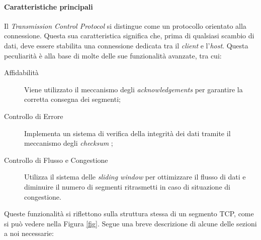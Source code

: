 \paragraph{ Caratteristiche principali}
\noindent Il \emph{Transmission Control Protocol} si distingue come un protocollo orientato alla connessione. Questa sua caratteristica significa che, prima di qualsiasi scambio di dati, deve essere stabilita una connessione dedicata tra il \emph{client \glsfirstoccur} e l'\emph{host\glsfirstoccur}.
Questa peculiarità è alla base di molte delle sue funzionalità avanzate, tra cui:
\begin{description}
    \item[Affidabilità] Viene utilizzato il meccanismo degli \emph{acknowledgements} \glsfirstoccur per garantire la corretta consegna dei segmenti;

    \item[Controllo di Errore] Implementa un sistema di verifica della integrità dei dati tramite il meccanismo degli \emph{checksum} \glsfirstoccur;
    
    \item[Controllo di Flusso e Congestione] Utilizza il sistema delle \emph{sliding window} \glsfirstoccur per ottimizzare il flusso di dati e diminuire il numero di segmenti ritrasmetti in caso di situazione di congestione.
\end{description}

\noindent Queste funzionalità si riflettono sulla struttura stessa di un segmento TCP, come si può vedere nella Figura \ref{fig}. Segue una breve descrizione di alcune delle sezioni a noi necessarie:

